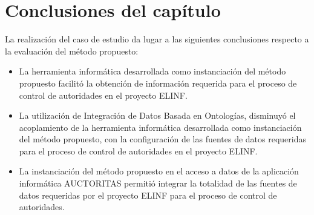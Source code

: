 \section{Conclusiones del capítulo}

La realización del caso de estudio da lugar a las siguientes conclusiones respecto a la evaluación del método propuesto:

\begin{itemize}
\item La herramienta informática desarrollada como instanciación del método propuesto facilitó la obtención de información requerida para el proceso de  control de autoridades en el proyecto ELINF.
\item La utilización de Integración de Datos Basada en Ontologías, disminuyó el acoplamiento de la herramienta informática desarrollada como instanciación del método propuesto, con la configuración de las fuentes de datos requeridas para el proceso de  control de autoridades en el proyecto ELINF.
\item La instanciación del método propuesto en el acceso a datos de la aplicación informática AUCTORITAS permitió integrar la totalidad de las fuentes de datos requeridas por el proyecto ELINF para el proceso de  control de autoridades.
\end{itemize}